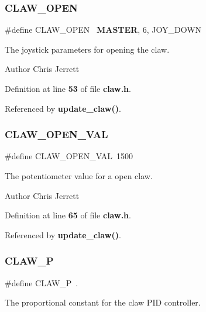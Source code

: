 \subsubsection{C\+L\+A\+W\+\_\+\+O\+P\+EN}
{\footnotesize\ttfamily \#define C\+L\+A\+W\+\_\+\+O\+P\+EN~\textbf{ M\+A\+S\+T\+ER}, 6, J\+O\+Y\+\_\+\+D\+O\+WN}



The joystick parameters for opening the claw. 

\begin{DoxyAuthor}{Author}
Chris Jerrett 
\end{DoxyAuthor}


Definition at line \textbf{ 53} of file \textbf{ claw.\+h}.



Referenced by \textbf{ update\+\_\+claw()}.

\mbox{\label{claw_8h_a519372d8dfa1706d706053ab035ea0b9}} 
\subsubsection{C\+L\+A\+W\+\_\+\+O\+P\+E\+N\+\_\+\+V\+AL}
{\footnotesize\ttfamily \#define C\+L\+A\+W\+\_\+\+O\+P\+E\+N\+\_\+\+V\+AL~1500}



The potentiometer value for a open claw. 

\begin{DoxyAuthor}{Author}
Chris Jerrett 
\end{DoxyAuthor}


Definition at line \textbf{ 65} of file \textbf{ claw.\+h}.



Referenced by \textbf{ update\+\_\+claw()}.

\mbox{\label{claw_8h_a1f95cce21c67a6f43850ab9660c2d68a}} 
\subsubsection{C\+L\+A\+W\+\_\+P}
{\footnotesize\ttfamily \#define C\+L\+A\+W\+\_\+P~.}



The proportional constant for the claw P\+ID controller. 

